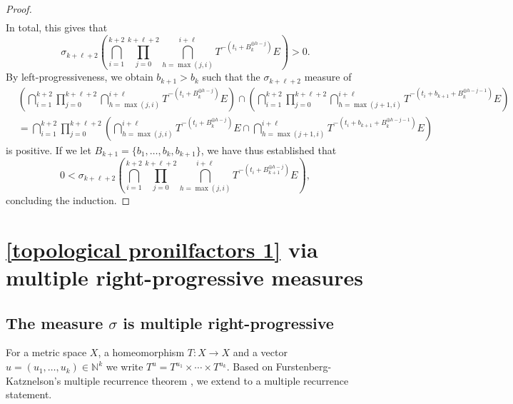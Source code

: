 \documentclass[letter, 11pt]{article}
\theoremstyle{definition}
\theoremstyle{plain}
\newcommand{\N}{\mathbb{N}}
\newcommand{\1}{\mathbbm{1}}
\begin{document}
\begin{proof}
\begin{align*}
           \end{align*}
    In total, this gives that 
    $$\sigma_{k+\ell+2}\left(\bigcap_{i=1}^{k+2}  \prod_{j=0}^{k+\ell+2}\bigcap_{h=\max(j,i)}^{i+\ell}  T^{-\left( t_i+ B_k^{\oplus h-j} \right)}  E   \right)>0. $$
   By left-progressiveness, we obtain $b_{k+1}>b_k$ such that the $\sigma_{k+\ell+2}$ measure of
   \begin{align*}
      &\left(\bigcap_{i=1}^{k+2}  \prod_{j=0}^{k+\ell+2}\bigcap_{h=\max(j,i)}^{i+\ell}  T^{-\left( t_i+ B_k^{\oplus h-j} \right)}  E   \right) \cap \left( \bigcap_{i=1}^{k+2}  \prod_{j=0}^{k+\ell+2}\bigcap_{h=\max(j+1,i)}^{i+\ell}  T^{-\left( t_i+ b_{k+1}+ B_k^{\oplus h-j-1} \right)}  E  \right) \\
      &=\bigcap_{i=1}^{k+2} \prod_{j=0}^{k+\ell+2} \left(\bigcap_{h=\max(j,i)}^{i+\ell}  T^{-\left( t_i+ B_k^{\oplus h-j} \right)}  E    \cap \bigcap_{h=\max(j+1,i)}^{i+\ell}  T^{-\left( t_i+b_{k+1}+ B_k^{\oplus h-j-1} \right)}  E \right)
   \end{align*}  
    is positive. If we let $B_{k+1}=\{b_1,\ldots,b_k,b_{k+1}\}$, we have thus established that 
   \begin{equation*}
       0<\sigma_{k+\ell+2}\left( \bigcap_{i=1}^{k+2}  \prod_{j=0}^{k+\ell+2}\bigcap_{h=\max(j,i)}^{i+\ell}  T^{-\left( t_i+ B_{k+1}^{\oplus h-j} \right)}  E   \right),  
   \end{equation*}
   concluding the induction. 
\end{proof}


\section{\cref{topological pronilfactors 1} via multiple right-progressive measures} \label{sec mult recurrence}

\subsection{The measure $\sigma$ is multiple right-progressive} \label{sec useful lemmas}

For a metric space $X$, a homeomorphism $T \colon X \to X$ and a vector $u = (u_1, \ldots, u_k) \in \N^k$ we write $T^u = T^{u_1} \times \cdots \times T^{u_k}$.  Based on Furstenberg-Katznelson's multiple recurrence theorem \cite[Theorem A]{Furstenberg_Katznelson78}, we extend \cite[Theorem 6.3]{kmrr25} to a multiple recurrence statement.
\end{document}
